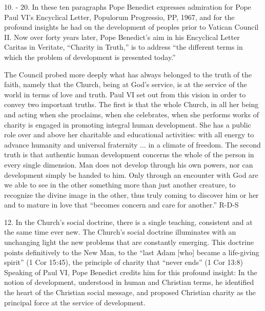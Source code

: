 \documentclass[oneside]{book}
\begin{document}
10. - 20. In these ten paragraphs Pope Benedict expresses admiration for Pope
Paul VI's Encyclical Letter, Populorum Progressio, PP, 1967, and for the
profound insights he had on the development of peoples prior to Vatican Council
II. Now over forty years later, Pope Benedict's aim in his Encyclical Letter
Caritas in Veritate, ``Charity in Truth,'' is to address ``the different terms
in which the problem of development is presented today.''

The Council probed more deeply what has always belonged to the truth of the
faith, namely that the Church, being at God's service, is at the service of the
world in terms of love and truth. Paul VI set out from this vision in order to
convey two important truths. The first is that the whole Church, in all her
being and acting  when she proclaims, when she celebrates, when she performs
works of charity  is engaged in promoting integral human development. She has a
public role over and above her charitable and educational activities: with all
energy to advance humanity and universal fraternity ... in a climate of
freedom. The second truth is that authentic human development concerns the whole
of the person in every single dimension. Man does not develop through his own
powers, nor can development simply be handed to him. Only through an encounter
with God are we able to see in the other something more than just another
creature, to recognize the divine image in the other, thus truly coming to
discover him or her and to mature in love that ``becomes concern and care for
another.''
R-D-S

12. In the Church's social doctrine, there is a single teaching, consistent and
at the same time ever new. The Church's social doctrine illuminates with an
unchanging light the new problems that are constantly emerging. This doctrine
points definitively to the New Man, to the ``last Adam [who] became a
life-giving spirit'' (1 Cor 15:45), the principle of charity that ``never ends''
(1 Cor 13:8) Speaking of Paul VI, Pope Benedict credits him for this profound
insight: In the notion of development, understood in human and Christian terms,
he identified the heart of the Christian social message, and proposed Christian
charity as the principal force at the service of development.
\end{document}
